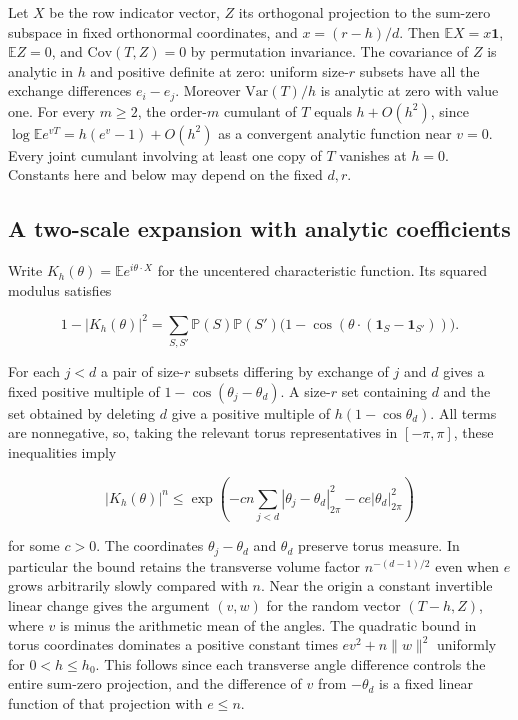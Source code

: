 \documentclass[11pt]{article}
\begin{document}
Let $X$ be the row indicator vector, $Z$ its orthogonal projection to the sum-zero subspace in fixed orthonormal coordinates, and $x=(r-h)/d$. Then $\mathbb E X=x\mathbf1$, $\mathbb EZ=0$, and $\mathrm{Cov}(T,Z)=0$ by permutation invariance. The covariance of $Z$ is analytic in $h$ and positive definite at zero: uniform size-$r$ subsets have all the exchange differences $e_i-e_j$. Moreover $\mathrm{Var}(T)/h$ is analytic at zero with value one. For every $m\ge2$, the order-$m$ cumulant of $T$ equals $h+O(h^2)$, since $\log\mathbb E e^{vT}=h(e^v-1)+O(h^2)$ as a convergent analytic function near $v=0$. Every joint cumulant involving at least one copy of $T$ vanishes at $h=0$. Constants here and below may depend on the fixed $d,r$.

\subsection{A two-scale expansion with analytic coefficients}

Write $K_h(\theta)=\mathbb E e^{i\theta\cdot X}$ for the uncentered characteristic function. Its squared modulus satisfies

\begin{equation*}
1-|K_h(\theta)|^2
=\sum_{S,S'}\mathbb P(S)\mathbb P(S')
\bigl(1-\cos(\theta\cdot(\mathbf1_S-\mathbf1_{S'}))\bigr).
\end{equation*}

For each $j<d$ a pair of size-$r$ subsets differing by exchange of $j$ and $d$ gives a fixed positive multiple of $1-\cos(\theta_j-\theta_d)$. A size-$r$ set containing $d$ and the set obtained by deleting $d$ give a positive multiple of $h(1-\cos\theta_d)$. All terms are nonnegative, so, taking the relevant torus representatives in $[-\pi,\pi]$, these inequalities imply

\begin{equation*}
|K_h(\theta)|^n
\le \exp\left(-c n\sum_{j<d}|\theta_j-\theta_d|_{2\pi}^2
-c e|\theta_d|_{2\pi}^2\right)
\end{equation*}

for some $c>0$. The coordinates $\theta_j-\theta_d$ and $\theta_d$ preserve torus measure. In particular the bound retains the transverse volume factor $n^{-(d-1)/2}$ even when $e$ grows arbitrarily slowly compared with $n$. Near the origin a constant invertible linear change gives the argument $(v,w)$ for the random vector $(T-h,Z)$, where $v$ is minus the arithmetic mean of the angles. The quadratic bound in torus coordinates dominates a positive constant times $e v^2+n\lVert w\rVert ^2$ uniformly for $0<h\le h_0$. This follows since each transverse angle difference controls the entire sum-zero projection, and the difference of $v$ from $-\theta_d$ is a fixed linear function of that projection with $e\le n$.
\end{document}

